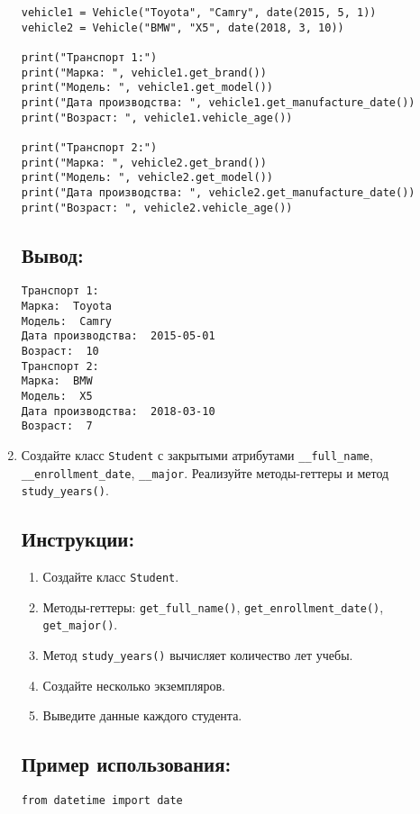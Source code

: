 \begin{enumerate}
\begin{lstlisting}[caption=Пример кода]
vehicle1 = Vehicle("Toyota", "Camry", date(2015, 5, 1))
vehicle2 = Vehicle("BMW", "X5", date(2018, 3, 10))

print("Транспорт 1:")
print("Марка: ", vehicle1.get_brand())
print("Модель: ", vehicle1.get_model())
print("Дата производства: ", vehicle1.get_manufacture_date())
print("Возраст: ", vehicle1.vehicle_age())

print("Транспорт 2:")
print("Марка: ", vehicle2.get_brand())
print("Модель: ", vehicle2.get_model())
print("Дата производства: ", vehicle2.get_manufacture_date())
print("Возраст: ", vehicle2.vehicle_age())
\end{lstlisting}

\subsection*{Вывод:}
\begin{lstlisting}[caption=Ожидаемый вывод]
Транспорт 1:
Марка:  Toyota
Модель:  Camry
Дата производства:  2015-05-01
Возраст:  10
Транспорт 2:
Марка:  BMW
Модель:  X5
Дата производства:  2018-03-10
Возраст:  7
\end{lstlisting}

\item
Создайте класс \texttt{Student} с закрытыми атрибутами \texttt{\_\_full\_name}, \texttt{\_\_enrollment\_date}, \texttt{\_\_major}. Реализуйте методы-геттеры и метод \texttt{study\_years()}.

\subsection*{Инструкции:}
\begin{enumerate}
    \item Создайте класс \texttt{Student}.
    \item Методы-геттеры: \texttt{get\_full\_name()}, \texttt{get\_enrollment\_date()}, \texttt{get\_major()}.
    \item Метод \texttt{study\_years()} вычисляет количество лет учебы.
    \item Создайте несколько экземпляров.
    \item Выведите данные каждого студента.
\end{enumerate}

\subsection*{Пример использования:}
\begin{lstlisting}[caption=Пример кода]
from datetime import date


\end{lstlisting}
\end{enumerate}
